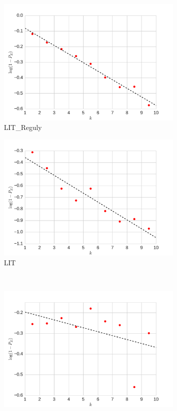 \begin{figure}[!ht]
    \centering
    \begin{subfigure}[b]{0.4\columnwidth}
        \includegraphics[width=\textwidth]{./schemes/yeast_LIT_Reguly.pdf}
        \caption{\label{fig:LITR}LIT\_Reguly}
    \end{subfigure}
    \begin{subfigure}[b]{0.4\columnwidth}
        \includegraphics[width=\textwidth]{./schemes/yeast_LIT.pdf}
        \caption{\label{fig:LIT} LIT}
    \end{subfigure}
    \\
    \begin{subfigure}[b]{0.4\columnwidth}
        \includegraphics[width=\textwidth]{./schemes/yeast_Y2H.pdf}

\end{subfigure}
\end{figure}

